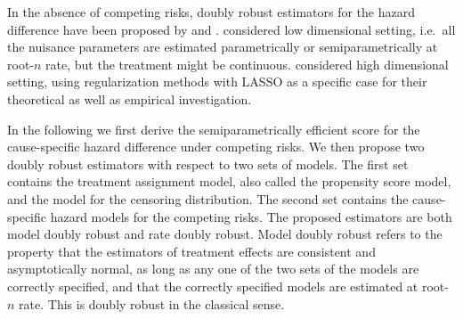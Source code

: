 \documentclass[11pt]{article}
\begin{document}

In the absence of competing risks, doubly robust estimators for the hazard difference have been proposed by \cite{Dukes:19} and \cite{hou2019estimating}.
\cite{Dukes:19} considered low dimensional setting, i.e.~all the nuisance parameters are estimated parametrically or semiparametrically at root-$n$ rate, but the treatment might be continuous.  \cite{hou2019estimating} considered high dimensional setting, using regularization methods with LASSO as a specific case for their theoretical as well as empirical investigation.

In the following we first derive the semiparametrically efficient score for the cause-specific hazard difference under competing risks. We then propose two doubly robust estimators 
with respect to two sets of models. The first set contains the treatment assignment model, also called the propensity score model,  and the model for the censoring distribution.  The second set contains the cause-specific hazard models for the competing risks. 
The proposed estimators are both model  doubly robust and rate doubly robust. 
Model doubly robust refers to the property that the estimators of treatment effects are consistent and asymptotically normal, as long as any 
 one of the two sets of the models are correctly specified, and that the correctly specified models are estimated at root-$n$ rate. This is doubly robust in the classical sense.
 
\end{document}
